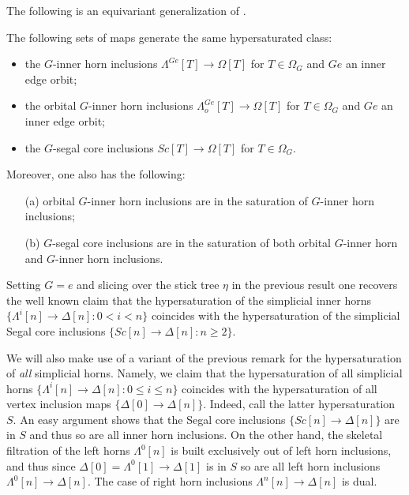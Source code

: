 \documentclass[a4paper,10p,draft]{article}%
\numberwithin{equation}{section}%
\begin{document}
The following is an equivariant generalization of 
\cite[Props. 2.4 and 2.5]{CM13a}.

\begin{proposition}\label{HYPER PROP}
The following sets of maps generate the same hypersaturated class:
\begin{itemize}
\item the $G$-inner horn inclusions
$\Lambda^{Ge} [T] \to \Omega[T]$ for $T \in \Omega_G$ and $Ge$ an inner edge orbit; 
\item the orbital $G$-inner horn inclusions
$\Lambda^{Ge}_o [T] \to \Omega[T]$ for $T \in \Omega_G$ and $Ge$ an inner edge orbit; 
\item the $G$-segal core inclusions
$Sc [T] \to \Omega[T]$ for $T \in \Omega_G$.
\end{itemize}
Moreover, one also has the following:
\begin{itemize}
	\item[(a)] orbital $G$-inner horn inclusions are in the saturation of $G$-inner horn inclusions;
	\item[(b)] $G$-segal core inclusions are in the saturation of both orbital $G$-inner horn and $G$-inner horn inclusions.
\end{itemize}
\end{proposition}


\begin{remark}
	Setting $G=e$ and slicing over the stick tree $\eta$ in the previous result
	one recovers the well known claim that 
	the hypersaturation of the simplicial inner horns
	$\{\Lambda^i[n] \to \Delta[n] \colon 0< i < n\}$
	coincides with the hypersaturation of the simplicial Segal core inclusions
	$\{Sc[n] \to \Delta[n]\colon n \geq 2\}$.
\end{remark}


\begin{remark}\label{HYPERSATKAN REM}
	We will also make use of a variant of the previous remark for the hypersaturation of \textit{all} simplicial horns.
	Namely, we claim that the hypersaturation of all simplicial horns 
	$\{\Lambda^i[n] \to \Delta[n] \colon 0 \leq i \leq n\}$
	coincides with the hypersaturation of all vertex inclusion maps
	$\{\Delta[0] \to \Delta[n]\}$.
	Indeed, call the latter hypersaturation $S$. 
	An easy argument shows that the Segal core inclusions 
	$\{Sc[n] \to \Delta[n]\}$ are in $S$ and thus so are all inner horn inclusions. On the other hand, the skeletal filtration of the left horns $\Lambda^0[n]$ is built exclusively out of left horn inclusions, and thus since $\Delta[0]=\Lambda^0[1] \to \Delta[1]$ is in $S$ so are all left horn inclusions 
	$\Lambda^0[n] \to \Delta[n]$. The case of right horn inclusions $\Lambda^n[n] \to \Delta[n]$ is dual.
\end{remark}
\end{document}
